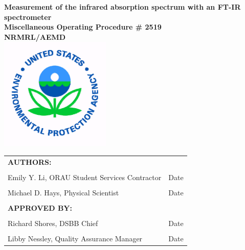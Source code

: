 \begin{titlepage}
    \begin{center}
        \textbf{\large{Measurement of the infrared absorption spectrum with an FT-IR spectrometer} \\
        \vspace{0.25in}
        Miscellaneous Operating Procedure \# 2519 \\ NRMRL/AEMD} \\
        \vspace{0.25in}
        \includegraphics{USEPAlogo.png}
        
        \vfill %
    \end{center}    
    
    \begin{table}[H]
    \centering
    \begin{tabular}{ l l }
    \textbf{AUTHORS:} &  \\ 
    \vspace{0.5in} &  \\ 
    \hline
    Emily Y. Li, ORAU Student Services Contractor & Date \\
     \vspace{0.5in} &  \\ 
    \hline
    Michael D. Hays, Physical Scientist & Date \\
    \vspace{0.25in} &  \\
    \textbf{APPROVED BY:} &  \\
    \vspace{0.5in} &  \\
    \hline
    Richard Shores, DSBB Chief & Date \\
    \vspace{0.5in} &  \\
    \hline
    Libby Nessley, Quality Assurance Manager\hspace{4cm} & Date\hspace{2cm}
    \end{tabular}
    \end{table}
        
\end{titlepage}